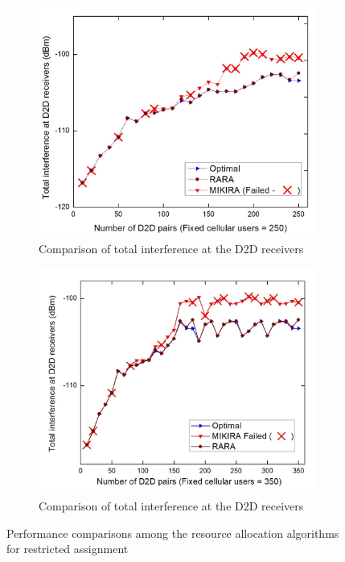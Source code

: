 \documentclass{ieeeaccess}
\begin{document}
\begin{figure}
\begin{multicols}{2}
\begin{subfigure}{.86\linewidth}
	\includegraphics[width=\linewidth]{Graph/inter_d2d_rara.jpg}\par
	\caption{Comparison of total interference at the D2D receivers}
	\label{fig:inter_d2d_res}
	\end{subfigure}
	
	\hspace{12pt}
	\begin{subfigure}{.87\linewidth}
	\includegraphics[width=\linewidth]{Graph/inter_d2d_rara_350.jpg}\par
	\caption{Comparison of total interference at the D2D receivers}
	\label{fig:inter_d2d_res_350}
	\end{subfigure}
	\end{multicols}
\caption{Performance comparisons among the resource allocation algorithms for restricted assignment}
\label{fig:res}
\end{figure}
\end{document}
